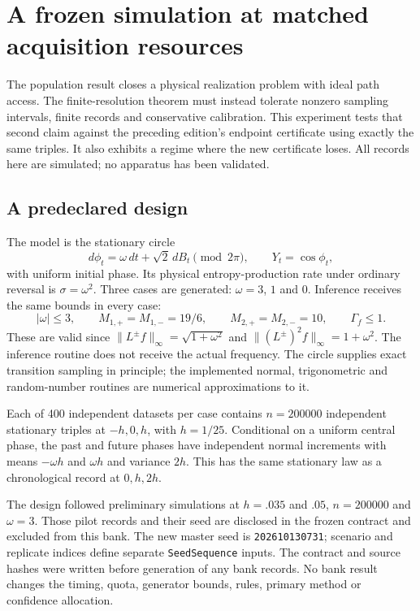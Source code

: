 \chapter{A frozen simulation at matched acquisition resources}
\label{ch:og-experiment}

The population result closes a physical realization problem with ideal path
access. The finite-resolution theorem must instead tolerate nonzero sampling
intervals, finite records and conservative calibration. This experiment tests
that second claim against the preceding edition's endpoint certificate using
exactly the same triples. It also exhibits a regime where the new certificate
loses. All records here are simulated; no apparatus has been validated.

\section{A predeclared design}
The model is the stationary circle
\begin{equation}
 d\phi_t=\omega\,dt+\sqrt{2}\,dB_t\pmod {2\pi},\qquad
 Y_t=\cos\phi_t,
\end{equation}
with uniform initial phase. Its physical entropy-production rate under ordinary
reversal is $\sigma=\omega^2$. Three cases are generated: $\omega=3$, $1$ and
$0$. Inference receives the same bounds in every case:
\begin{equation}
 |\omega|\le3,\qquad M_{1,+}=M_{1,-}=19/6,\qquad
 M_{2,+}=M_{2,-}=10,\qquad \Gamma_f\le1.
\end{equation}
These are valid since $\|L^{\pm}f\|_\infty=\sqrt{1+\omega^2}$ and
$\|(L^{\pm})^2f\|_\infty=1+\omega^2$. The inference routine does not receive
the actual frequency. The circle supplies exact transition sampling in
principle; the implemented normal, trigonometric and random-number routines are
numerical approximations to it.

Each of 400 independent datasets per case contains $n=200000$ independent
stationary triples at $-h,0,h$, with $h=1/25$. Conditional on a uniform central
phase, the past and future phases have independent normal increments with
means $-\omega h$ and $\omega h$ and variance $2h$. This has the same stationary
law as a chronological record at $0,h,2h$.

The design followed preliminary simulations at $h=.035$ and $.05$, $n=200000$
and $\omega=3$. Those pilot records and their seed are disclosed in the frozen
contract and excluded from this bank. The new master seed is
\texttt{202610130731}; scenario and replicate indices define separate
\texttt{SeedSequence} inputs. The contract and source hashes were written
before generation of any bank records. No bank result changes the timing,
quota, generator bounds, rules, primary method or confidence allocation.

